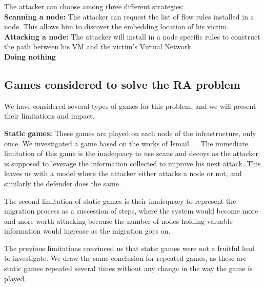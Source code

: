 The attacker can choose among three different strategies:\\
\textbf{Scanning a node: } The attacker can request the list of  flow rules installed in a node. This allows him to discover the embedding location of his victim.\\
\textbf{Attacking a node: } The attacker will install in a node specific rules to construct the path between his VM and the victim's Virtual Network.\\
\textbf{Doing nothing}\\



\subsection{Games considered to solve the RA problem}
We have considered several types of games for this problem, and we will present their limitations and impact.

\textbf{Static games:} These games are played on each node of the infrastructure, only once. We investigated a game based on the works of Ismail~\etal~\cite{Chen2009,interdep-ismail2017}. The immediate limitation of this game is the inadequacy to use scans and decoys as the attacker is supposed to leverage the information collected to improve his next attack. This leaves us with a model where the attacker either attacks a node or not, and similarly the defender does the same.

The second limitation of static games is their inadequacy to represent the migration process as a succession of steps, where the system would become more and more worth attacking because the number of nodes holding valuable information would increase as the migration goes on.


The previous limitations convinced us that static games were not a fruitful lead to investigate.
We draw the same conclusion for repeated games, as these are static games repeated several times without any change in the way the game is played.



